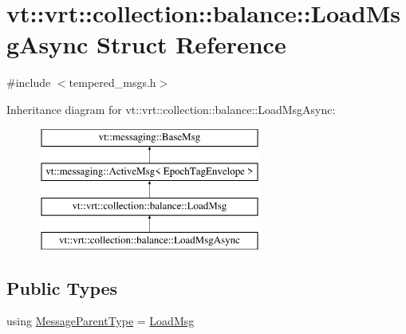 \hypertarget{structvt_1_1vrt_1_1collection_1_1balance_1_1_load_msg_async}{}\section{vt\+:\+:vrt\+:\+:collection\+:\+:balance\+:\+:Load\+Msg\+Async Struct Reference}
\label{structvt_1_1vrt_1_1collection_1_1balance_1_1_load_msg_async}


{\ttfamily \#include $<$tempered\+\_\+msgs.\+h$>$}

Inheritance diagram for vt\+:\+:vrt\+:\+:collection\+:\+:balance\+:\+:Load\+Msg\+Async\+:\begin{figure}[H]
\begin{center}
\leavevmode
\includegraphics[height=4.000000cm]{structvt_1_1vrt_1_1collection_1_1balance_1_1_load_msg_async}
\end{center}
\end{figure}
\subsection*{Public Types}
\begin{DoxyCompactItemize}
\item 
using \hyperlink{structvt_1_1vrt_1_1collection_1_1balance_1_1_load_msg_async_a6581fa4f51cc442179e9aba1fd3e3bee}{Message\+Parent\+Type} = \hyperlink{structvt_1_1vrt_1_1collection_1_1balance_1_1_load_msg}{Load\+Msg}
\end{DoxyCompactItemize}
